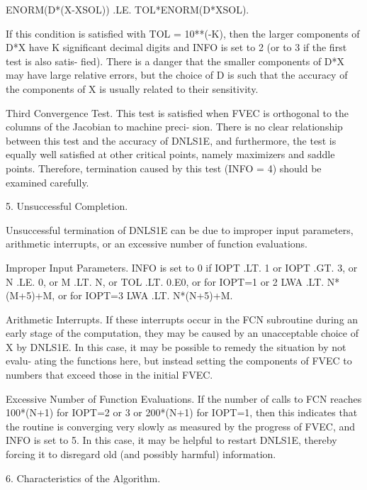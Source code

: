 \documentclass[11pt,twoside,nolof]{starlink}
\begin{document}
\begin{terminalv}
               ENORM(D*(X-XSOL)) .LE.  TOL*ENORM(D*XSOL).

         If this condition is satisfied with TOL = 10**(-K), then the
         larger components of D*X have K significant decimal digits and
         INFO is set to 2 (or to 3 if the first test is also satis-
         fied).  There is a danger that the smaller components of D*X
         may have large relative errors, but the choice of D is such
         that the accuracy of the components of X is usually related to
         their sensitivity.

       Third Convergence Test.  This test is satisfied when FVEC is
         orthogonal to the columns of the Jacobian to machine preci-
         sion.  There is no clear relationship between this test and
         the accuracy of DNLS1E, and furthermore, the test is equally
         well satisfied at other critical points, namely maximizers and
         saddle points.  Therefore, termination caused by this test
         (INFO = 4) should be examined carefully.


 5. Unsuccessful Completion.

       Unsuccessful termination of DNLS1E can be due to improper input
       parameters, arithmetic interrupts, or an excessive number of
       function evaluations.

       Improper Input Parameters.  INFO is set to 0 if IOPT .LT. 1
         or IOPT .GT. 3, or N .LE. 0, or M .LT. N, or TOL .LT. 0.E0,
         or for IOPT=1 or 2 LWA .LT. N*(M+5)+M, or for IOPT=3
         LWA .LT. N*(N+5)+M.

       Arithmetic Interrupts.  If these interrupts occur in the FCN
         subroutine during an early stage of the computation, they may
         be caused by an unacceptable choice of X by DNLS1E.  In this
         case, it may be possible to remedy the situation by not evalu-
         ating the functions here, but instead setting the components
         of FVEC to numbers that exceed those in the initial FVEC.

       Excessive Number of Function Evaluations.  If the number of
         calls to FCN reaches 100*(N+1) for IOPT=2 or 3 or 200*(N+1)
         for IOPT=1, then this indicates that the routine is converging
         very slowly as measured by the progress of FVEC, and INFO is
         set to 5.  In this case, it may be helpful to restart DNLS1E,
         thereby forcing it to disregard old (and possibly harmful)
         information.


 6. Characteristics of the Algorithm.


\end{terminalv}
\end{document}
